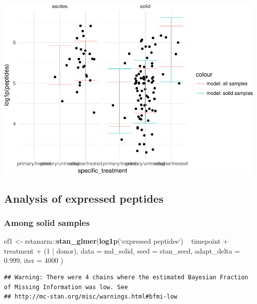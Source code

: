 \documentclass[]{article}
\newenvironment{Shaded}{\begin{snugshade}}{\end{snugshade}}
\newcommand{\KeywordTok}[1]{\textcolor[rgb]{0.13,0.29,0.53}{\textbf{{#1}}}}
\newcommand{\DataTypeTok}[1]{\textcolor[rgb]{0.13,0.29,0.53}{{#1}}}
\newcommand{\DecValTok}[1]{\textcolor[rgb]{0.00,0.00,0.81}{{#1}}}
\newcommand{\FloatTok}[1]{\textcolor[rgb]{0.00,0.00,0.81}{{#1}}}
\newcommand{\StringTok}[1]{\textcolor[rgb]{0.31,0.60,0.02}{{#1}}}
\newcommand{\NormalTok}[1]{{#1}}
\begin{document}
\includegraphics{Hierarchical_model_mutations_and_peptides_files/figure-latex/allsamp-peptides-ppred-1.pdf}

\subsection{Analysis of expressed
peptides}\label{analysis-of-expressed-peptides}

\subsubsection{Among solid samples}\label{among-solid-samples-1}

\begin{Shaded}
\begin{Highlighting}[]
\NormalTok{ef1 <-}\StringTok{ }\NormalTok{rstanarm::}\KeywordTok{stan_glmer}\NormalTok{(}\KeywordTok{log1p}\NormalTok{(}\StringTok{`}\DataTypeTok{expressed peptides}\StringTok{`}\NormalTok{) ~}
\StringTok{                                }\NormalTok{timepoint +}\StringTok{ }\NormalTok{treatment +}\StringTok{ }\NormalTok{(}\DecValTok{1} \NormalTok{|}\StringTok{ }\NormalTok{donor),}
                              \DataTypeTok{data =} \NormalTok{md_solid,}
                              \DataTypeTok{seed =} \NormalTok{stan_seed,}
                              \DataTypeTok{adapt_delta =} \FloatTok{0.999}\NormalTok{,}
                              \DataTypeTok{iter =} \DecValTok{4000}
                              \NormalTok{)}
\end{Highlighting}
\end{Shaded}

\begin{verbatim}
## Warning: There were 4 chains where the estimated Bayesian Fraction of Missing Information was low. See
## http://mc-stan.org/misc/warnings.html#bfmi-low
\end{verbatim}
\end{document}
